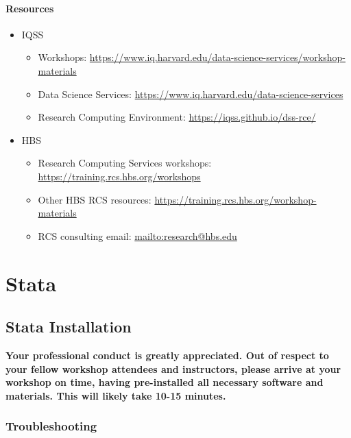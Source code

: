 \documentclass[
]{book}
\providecommand{\tightlist}{%
  \setlength{\itemsep}{0pt}\setlength{\parskip}{0pt}}
\begin{document}
\hypertarget{resources-8}{%
\subsection{Resources}\label{resources-8}}

\begin{itemize}
\tightlist
\item
  IQSS

  \begin{itemize}
  \tightlist
  \item
    Workshops: \url{https://www.iq.harvard.edu/data-science-services/workshop-materials}
  \item
    Data Science Services: \url{https://www.iq.harvard.edu/data-science-services}
  \item
    Research Computing Environment: \url{https://iqss.github.io/dss-rce/}
  \end{itemize}
\item
  HBS

  \begin{itemize}
  \tightlist
  \item
    Research Computing Services workshops: \url{https://training.rcs.hbs.org/workshops}
  \item
    Other HBS RCS resources: \url{https://training.rcs.hbs.org/workshop-materials}
  \item
    RCS consulting email: \url{mailto:research@hbs.edu}
  \end{itemize}
\end{itemize}

\hypertarget{part-stata}{%
\part{Stata}\label{part-stata}}

\hypertarget{stata-installation}{%
\chapter{Stata Installation}\label{stata-installation}}

\textbf{Your professional conduct is greatly appreciated. Out of respect to your fellow workshop attendees and instructors, please arrive at your workshop on time, having pre-installed all necessary software and materials. This will likely take 10-15 minutes.}

\hypertarget{troubleshooting}{%
\section{Troubleshooting}\label{troubleshooting}}
\end{document}
